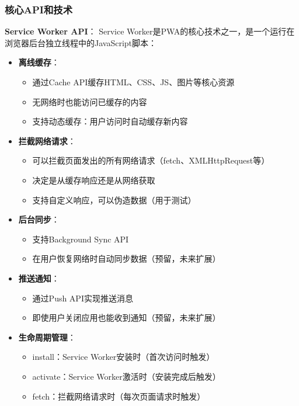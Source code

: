 \documentclass[12pt,a4paper]{article}
\begin{document}
\subsubsection{核心API和技术}

\textbf{Service Worker API}：
Service Worker是PWA的核心技术之一，是一个运行在浏览器后台独立线程中的JavaScript脚本：

\begin{itemize}
    \item \textbf{离线缓存}：
        \begin{itemize}
            \item 通过Cache API缓存HTML、CSS、JS、图片等核心资源
            \item 无网络时也能访问已缓存的内容
            \item 支持动态缓存：用户访问时自动缓存新内容
        \end{itemize}
    \item \textbf{拦截网络请求}：
        \begin{itemize}
            \item 可以拦截页面发出的所有网络请求（fetch、XMLHttpRequest等）
            \item 决定是从缓存响应还是从网络获取
            \item 支持自定义响应，可以伪造数据（用于测试）
        \end{itemize}
    \item \textbf{后台同步}：
        \begin{itemize}
            \item 支持Background Sync API
            \item 在用户恢复网络时自动同步数据（预留，未来扩展）
        \end{itemize}
    \item \textbf{推送通知}：
        \begin{itemize}
            \item 通过Push API实现推送消息
            \item 即使用户关闭应用也能收到通知（预留，未来扩展）
        \end{itemize}
    \item \textbf{生命周期管理}：
        \begin{itemize}
            \item install：Service Worker安装时（首次访问时触发）
            \item activate：Service Worker激活时（安装完成后触发）
            \item fetch：拦截网络请求时（每次页面请求时触发）
        \end{itemize}
\end{itemize}
\end{document}
